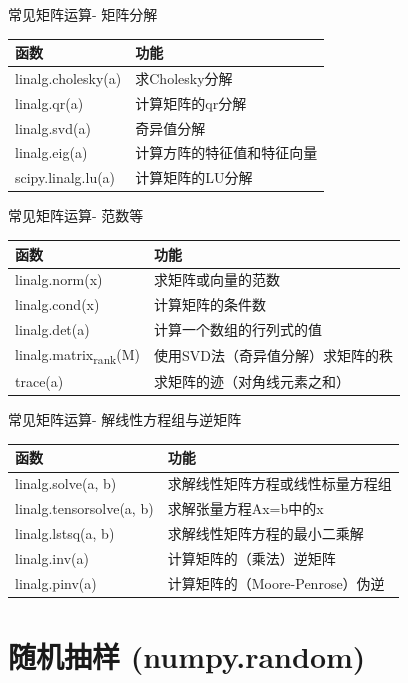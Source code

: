 \documentclass[ignorenonframetext,11pt,xcolor=dvipsnames,hyperref={colorlinks,allcolors=.,urlcolor=blue, citecolor=violet, bookmarksdepth=4},aspectratio=1610]{beamer}
\begin{document}
\begin{frame}{常见矩阵运算- 矩阵分解}
\protect\hypertarget{section-32}{}

\begin{longtable}[]{@{}ll@{}}
\toprule
函数 & 功能\tabularnewline
\midrule
\endhead
linalg.cholesky(a) & 求Cholesky分解\tabularnewline
linalg.qr(a) & 计算矩阵的qr分解\tabularnewline
linalg.svd(a) & 奇异值分解\tabularnewline
linalg.eig(a) & 计算方阵的特征值和特征向量\tabularnewline
scipy.linalg.lu(a) & 计算矩阵的LU分解\tabularnewline
\bottomrule
\end{longtable}

\end{frame}

\begin{frame}{常见矩阵运算- 范数等}
\protect\hypertarget{section-33}{}

\begin{longtable}[]{@{}ll@{}}
\toprule
函数 & 功能\tabularnewline
\midrule
\endhead
linalg.norm(x) & 求矩阵或向量的范数\tabularnewline
linalg.cond(x) & 计算矩阵的条件数\tabularnewline
linalg.det(a) & 计算一个数组的行列式的值\tabularnewline
linalg.matrix\textsubscript{rank}(M) &
使用SVD法（奇异值分解）求矩阵的秩\tabularnewline
trace(a) & 求矩阵的迹（对角线元素之和）\tabularnewline
\bottomrule
\end{longtable}

\end{frame}

\begin{frame}{常见矩阵运算- 解线性方程组与逆矩阵}
\protect\hypertarget{section-34}{}

\begin{longtable}[]{@{}ll@{}}
\toprule
函数 & 功能\tabularnewline
\midrule
\endhead
linalg.solve(a, b) & 求解线性矩阵方程或线性标量方程组\tabularnewline
linalg.tensorsolve(a, b) & 求解张量方程Ax=b中的x\tabularnewline
linalg.lstsq(a, b) & 求解线性矩阵方程的最小二乘解\tabularnewline
linalg.inv(a) & 计算矩阵的（乘法）逆矩阵\tabularnewline
linalg.pinv(a) & 计算矩阵的（Moore-Penrose）伪逆\tabularnewline
\bottomrule
\end{longtable}

\end{frame}

\hypertarget{numpy.random}{%
\section{随机抽样 (numpy.random)}\label{numpy.random}}
\end{document}
